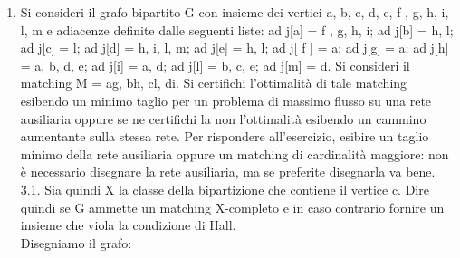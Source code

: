 \documentclass[10pt,a4paper,titlepage]{article}
\theoremstyle{break}
\theoremstyle{break}
\theoremstyle{break}
\begin{document}
\begin{enumerate}
\item Si consideri il grafo bipartito G con insieme dei vertici {a, b, c, d, e, f , g, h, i, l, m} e adiacenze definite dalle
seguenti liste: ad j[a] = { f , g, h, i}; ad j[b] = {h, l}; ad j[c] = {l}; ad j[d] = {h, i, l, m}; ad j[e] = {h, l};
ad j[ f ] = {a}; ad j[g] = {a}; ad j[h] = {a, b, d, e}; ad j[i] = {a, d}; ad j[l] = {b, c, e}; ad j[m] = {d}. Si
consideri il matching M = {ag, bh, cl, di}. Si certifichi l'ottimalità di tale matching esibendo un minimo
taglio per un problema di massimo flusso su una rete ausiliaria oppure se ne certifichi la non l'ottimalità esibendo un cammino aumentante sulla stessa rete. Per rispondere all'esercizio, esibire un taglio minimo della
rete ausiliaria oppure un matching di cardinalità maggiore: non è necessario disegnare la rete ausiliaria, ma
se preferite disegnarla va bene.
3.1. Sia quindi X la classe della bipartizione che contiene il vertice c. Dire quindi se G ammette un matching
X-completo e in caso contrario fornire un insieme che viola la condizione di Hall. \\

Disegniamo il grafo:

\begin{multicols}{2}


\end{multicols}
\end{enumerate}
\end{document}

